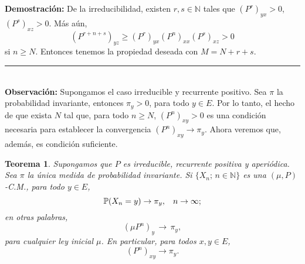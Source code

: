 \documentclass[a4paper]{article}
\newcommand{\prob}{\mathbb{P}}
\newtheorem{teorema}{Teorema}
\numberwithin{equation}{subsection}
\numberwithin{definicion}{subsection}
\def\N{\mathbb N}
\begin{document}
\textbf{Demostración: }De la irreducibilidad, existen $r,s\in \N$ tales que $(P^r)_{yx} >0$, $(P^s)_{xz}>0$. Más aún,
\[(P^{r+n+s})_{yz}\geq (P^r)_{yx}(P^n)_{xx}(P^s)_{xz}>0\]
si $n\geq N$. Entonces tenemos la propiedad deseada con $M=N+r+s$.\\
\rule{0.7em}{0.7em}\\ \newline
\textbf{Observación: }Supongamos el caso irreducible y recurrente positivo. Sea $\pi$ la probabilidad invariante, entonces $\pi_y>0$, para todo $y\in E$. Por lo tanto, el hecho de que exista $N$ tal que, para todo $n\geq N$, $(P^n)_{xy}>0$ es una condición necesaria para establecer la convergencia $(P^n)_{xy}\rightarrow \pi_y$. Ahora veremos que, además, es condición suficiente.\\ \newline
\begin{teorema}
Supongamos que $P$ es irreducible, recurrente positiva y aperiódica. Sea $\pi$ la única medida de probabilidad invariante. Si $\{X_n;\,n\in\N\}$ es una $(\mu,P)$-C.M., para todo $y\in E$,
\[\prob(X_n = y)\rightarrow \pi_y,\hspace{0.3cm}n\rightarrow \infty;\]
en otras palabras, 
\[(\mu P^n)_y \, \rightarrow\,\pi_y,\] 
para cualquier ley inicial $\mu$. En particular, para todos $x,y\in E$,
\[(P^n)_{xy}\rightarrow \pi_y.\]
\end{teorema}
\end{document}
